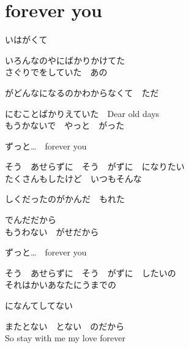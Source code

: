 \section{ forever you}
\large{

いはがくて

いろんなのやにばかりかけてた
\\

さぐりでをしていた　あの

がどんなになるのかわからなくて　ただ

にむことばかりえていた　Dear old days
\\

もうかないで　やっと　がった

ずっと…　forever you

そう　あせらずに　そう　がずに　になりたい
\\

たくさんもしたけど　いつもそんな

しくだったのがかんだ　もれた

でんだだから
\\

もうわない　がせだから

ずっと…　forever you

そう　あせらずに　そう　がずに　したいの
\\

それはかいあなたにうまでの

になんてしてない

またとない　とない　のだから
\\

So stay with me my love forever

}